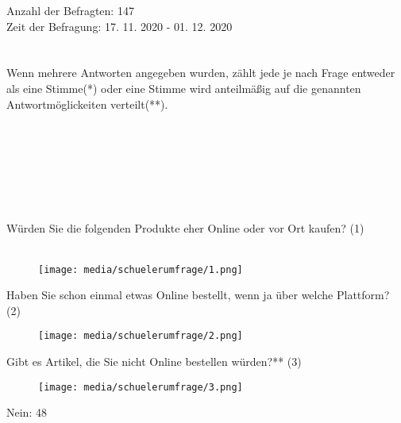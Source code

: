 \normalsize
Anzahl der Befragten: 147\\
Zeit der Befragung: 17. 11. 2020 - 01. 12. 2020\\\\\\
Wenn mehrere Antworten angegeben wurden, zählt jede je nach Frage entweder als eine Stimme(*) oder eine Stimme wird anteilmäßig auf die genannten Antwortmöglickeiten verteilt(**).\\\\\\\\\\\\\\\\
Würden Sie die folgenden Produkte eher Online oder vor Ort kaufen? (1)\\\\
\begin{figure}[H]
    \begin{center}
        \texttt{[image: media/schuelerumfrage/1.png]}
    \end{center}
\end{figure} 
\iffalse
Nahrungsmittel: 1 Online / 146 vor Ort

Technik: 99 Online / 47 vor Ort

Bekleidung: 74 Online / 72 vor Ort

Möbel: 24 Online / 122 vor Ort

Spielwaren: 111 Online / 36 vor Ort

Haushaltswaren: 61 Online / 86 vor Ort

Tierprodukte: 31 Online / 116 vor Ort\\\\
\fi 
\newpage\noindent Haben Sie schon einmal etwas Online bestellt, wenn ja über welche Plattform? (2)\\
\begin{figure}[H]
    \begin{center}
        \texttt{[image: media/schuelerumfrage/2.png]} 
    \end{center}
\end{figure}
\iffalse
Amazon: 139/147

Ebay: 78/147

Andere: Bershka(1), Shein(1), Zaful(3), Zalando(7), Etsy(4), H\&M(2), EMP(2), Maciag Offroad(1), Reifendirekt(1), Thalia(4), Böttcher AG(1), Globetrotter(1), Intersport(2)\\\\
\fi
\noindent Gibt es Artikel, die Sie nicht Online bestellen würden?** (3)\\
\begin{figure}[H]
    \begin{center}
        \texttt{[image: media/schuelerumfrage/3.png]}
    \end{center}
\end{figure}
\iffalse
Nein: 48

